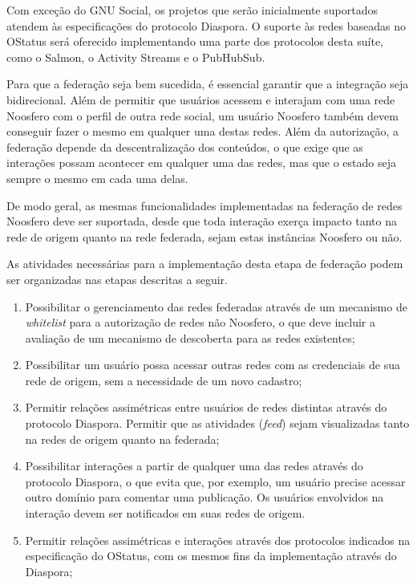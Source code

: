 Com exceção do GNU Social, os projetos que serão inicialmente suportados atendem às
especificações do protocolo Diaspora. O suporte às redes baseadas no OStatus será
oferecido implementando uma parte dos protocolos desta suíte, como o Salmon, o
Activity Streams e o PubHubSub.

Para que a federação seja bem sucedida, é essencial garantir que a integração seja
bidirecional. Além de permitir que usuários acessem e interajam com uma rede
Noosfero com o perfil de outra rede social, um usuário Noosfero também devem
conseguir fazer o mesmo em qualquer uma destas redes. Além da autorização, a
federação depende da descentralização dos conteúdos, o que exige que as interações
possam acontecer em qualquer uma das redes, mas que o estado seja sempre o mesmo
em cada uma delas.

De modo geral, as mesmas funcionalidades implementadas na federação de redes
Noosfero deve ser suportada, desde que toda interação exerça impacto tanto na rede
de origem quanto na rede federada, sejam estas instâncias Noosfero ou não.

As atividades necessárias para a implementação desta etapa de federação podem ser
organizadas nas etapas descritas a seguir.


\begin{enumerate}
  \item{Possibilitar o gerenciamento das redes federadas através de um  mecanismo de 
        \textit{whitelist} para a autorização de redes não Noosfero, o que deve
        incluir a avaliação de um mecanismo de descoberta para as redes existentes;}

  \item{Possibilitar um usuário possa acessar outras redes com as credenciais de sua
        rede de origem, sem a necessidade de um novo cadastro;}

  \item{Permitir relações assimétricas entre usuários de redes distintas através do
        protocolo Diaspora. Permitir que as atividades (\textit{feed}) sejam
        visualizadas tanto na redes de origem quanto na federada;}

  \item{Possibilitar interações a partir de qualquer uma das redes através do
        protocolo Diaspora, o que evita que, por exemplo, um usuário precise acessar
        outro domínio para comentar uma publicação. Os usuários envolvidos na
        interação devem ser notificados em suas redes de origem.}

  \item{Permitir relações assimétricas e interações através dos protocolos indicados
        na especificação do OStatus, com os mesmos fins da implementação através do
        Diaspora;}
\end{enumerate}

